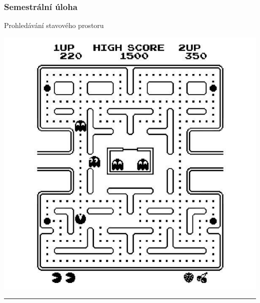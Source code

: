 \documentclass[usenames,dvipsnames,9pt]{beamer}
\begin{document}
\begin{frame}
  \frametitle{Semestrální úloha}
  \begin{center}
    \Large Prohledávání stavového prostoru
  \end{center}
  
    \vspace{1em}
  
  \begin{center}
  \includegraphics[width=.4\linewidth]{07/figs/pacman2.pdf}
  \end{center}
  
%

  \vspace{2em}

  \hrule
  \begin{center}
  \end{center}
\end{frame}

\framefeedback{}
\end{document}
